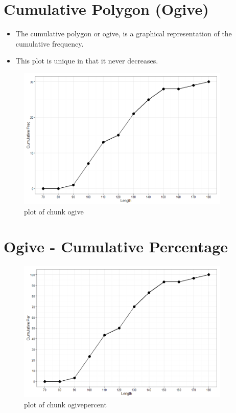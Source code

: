 \documentclass[12pt]{article}
\begin{document}
\section{Cumulative Polygon (Ogive)}\label{cumulative-polygon-ogive}

\begin{itemize}
\itemsep1pt\parskip0pt
\item
  The cumulative polygon or ogive, is a graphical representation of the
  cumulative frequency.
\item
  This plot is unique in that it never decreases.
\end{itemize}

\begin{figure}[H]
\centering
\includegraphics[width=4in]{figure/ogive-1.png}
\caption{plot of chunk ogive}
\end{figure}

\section{Ogive - Cumulative
Percentage}\label{ogive---cumulative-percentage}

\begin{figure}[H]
\centering
\includegraphics[width=4in]{figure/ogivepercent-1.png}
\caption{plot of chunk ogivepercent}
\end{figure}
\end{document}
